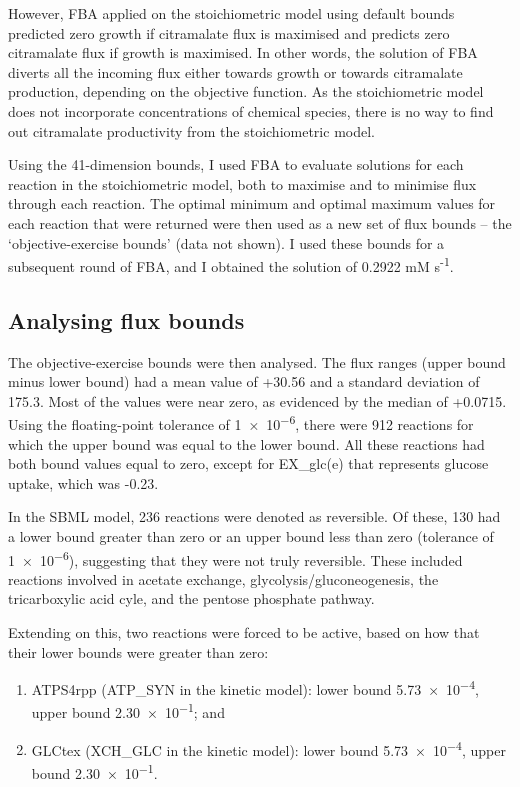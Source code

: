 \documentclass[parskip=full, numbers=noenddot]{scrreprt}
\begin{document}
However, FBA applied on the stoichiometric model using default bounds predicted zero growth if citramalate flux is maximised and predicts zero citramalate flux if growth is maximised. In other words, the solution of FBA diverts all the incoming flux either towards growth or towards citramalate production, depending on the objective function. As the stoichiometric model does not incorporate concentrations of chemical species, there is no way to find out citramalate productivity from the stoichiometric model.

Using the 41-dimension bounds, I used FBA to evaluate solutions for each reaction in the stoichiometric model, both to maximise and to minimise flux through each reaction. The optimal minimum and optimal maximum values for each reaction that were returned were then used as a new set of flux bounds -- the `objective-exercise bounds' (data not shown). I used these bounds for a subsequent round of FBA, and I obtained the solution of 0.2922 mM s\textsuperscript{-1}.

\subsection{Analysing flux bounds}
\label{ssec:objectiveexercise}

The objective-exercise bounds were then analysed. The flux ranges (upper bound minus lower bound) had a mean value of +30.56 and a standard deviation of 175.3. Most of the values were near zero, as evidenced by the median of +0.0715. Using the floating-point tolerance of \num{1e-6}, there were 912 reactions for which the upper bound was equal to the lower bound. All these reactions had both bound values equal to zero, except for EX\_glc(e) that represents glucose uptake, which was -0.23.

In the SBML model, 236 reactions were denoted as reversible. Of these, 130 had a lower bound greater than zero or an upper bound less than zero (tolerance of \num{1e-6}), suggesting that they were not truly reversible. These included reactions involved in acetate exchange, glycolysis/gluconeogenesis, the tricarboxylic acid cyle, and the pentose phosphate pathway.

Extending on this, two reactions were forced to be active, based on how that their lower bounds were greater than zero:
\begin{enumerate}
\item ATPS4rpp (ATP\_SYN in the kinetic model): lower bound \num{5.73e-4}, upper bound \num{2.30e-1}; and
  \item GLCtex (XCH\_GLC in the kinetic model): lower bound \num{5.73e-4}, upper bound \num{2.30e-1}.
  \end{enumerate}
\end{document}
